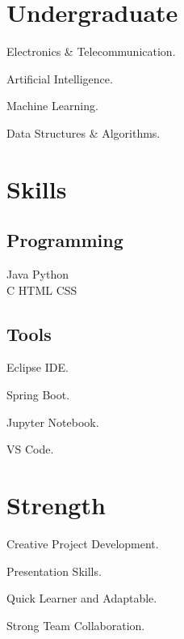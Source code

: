 \documentclass[]{deedy-resume-openfont}
\begin{document}
\begin{minipage}[t]{0.33\textwidth}
\section{Undergraduate}
\vspace{\topsep} %
\begin{tightemize}
\item Electronics \& Telecommunication.
\item Artificial Intelligence.
\item Machine Learning.
\item Data Structures \& Algorithms.
\end{tightemize}
\sectionsep

\section{Skills}
\subsection{Programming}
Java \textbullet{} Python \\
C \textbullet{} HTML \textbullet{} CSS
\sectionsep


\subsection{Tools}
\vspace{\topsep} %
\begin{tightemize}
\item Eclipse IDE.
\item Spring Boot.
\item Jupyter Notebook.
\item VS Code.
\end{tightemize}
\sectionsep

\section{Strength}
\vspace{\topsep} %
\begin{tightemize}
\item Creative Project Development.
\item Presentation Skills.
\item Quick Learner and Adaptable.
\item Strong Team Collaboration.
\end{tightemize}
\sectionsep


%
%

\end{minipage} 
\end{document}
